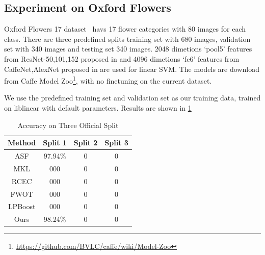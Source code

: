 \documentclass[letterpaper]{article}
\begin{document}
\subsection{Experiment on Oxford Flowers}
Oxford Flowers 17 dataset~\cite{nilsback2006visual} havs 17 flower categories with 80 images for each class. There are three predefined splits training set with 680 images, validation set with 340 images and testing set 340 images. 2048 dimetions `pool5' features from ResNet-50,101,152 proposed in \cite{he2015deep} and 4096 dimetions `fc6' features from CaffeNet,AlexNet proposed in \cite{krizhevsky2012imagenet} are used for linear SVM. The models are download from Caffe Model Zoo\footnote{\url{https://github.com/BVLC/caffe/wiki/Model-Zoo}}, with no finetuning on the current dataset.

We use the predefined training set and validation set as our training data, trained on liblinear with default parameters.
Results are shown in \ref{table:flower17}


\begin{table}[h]\scriptsize
\centering
\label{table:flower17}
\begin{tabular}{c|c|c|c}
\hline
Method & Split 1 & Split 2 & Split 3\\\hline
ASF &  97.94\% & 0 & 0 \\
MKL &  000 & 0 & 0 \\
RCEC &  000 & 0 & 0 \\
FWOT &  000 & 0 & 0 \\
LPBoost & 000 & 0 & 0 \\\hline
Ours &  98.24\% & 0 & 0 \\
\hline
\end{tabular}
\caption{Accuracy on Three Official Split}
\end{table}

\begin{quote}
\begin{small}
  
  
\end{small}
\end{quote}
\end{document}
